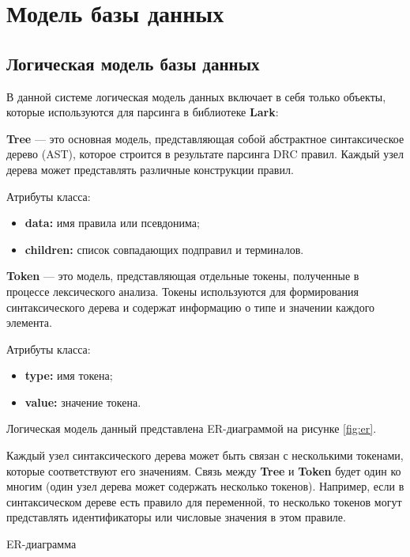 \section{Модель базы данных}

\subsection{Логическая модель базы данных}

В данной системе логическая модель данных включает в себя только объекты,
которые используются для парсинга в библиотеке \textbf{Lark}:

\textbf{Tree} --- это основная модель,
представляющая собой абстрактное синтаксическое дерево (AST),
которое строится в результате парсинга DRC правил.
Каждый узел дерева может представлять различные конструкции правил.

Атрибуты класса:

\begin{itemize}
	\item \textbf{data:} имя правила или псевдонима;
	\item \textbf{children:} список совпадающих подправил и терминалов.
\end{itemize}

\textbf{Token} --- это модель, представляющая отдельные токены,
полученные в процессе лексического анализа.
Токены используются для формирования синтаксического дерева
и содержат информацию о типе и значении каждого элемента.

Атрибуты класса:

\begin{itemize}
	\item \textbf{type:} имя токена;
	\item \textbf{value:} значение токена.
\end{itemize}

Логическая модель данный представлена ER-диаграммой на рисунке \ref{fig:er}.

Каждый узел синтаксического дерева может быть связан
с несколькими токенами, которые соответствуют его значениям.
Связь между \textbf{Tree} и \textbf{Token} будет один ко многим
(один узел дерева может содержать несколько токенов).
Например, если в синтаксическом дереве есть правило для переменной,
то несколько токенов могут представлять идентификаторы
или числовые значения в этом правиле.

\begin{image}
	\caption{ER-диаграмма}
	\label{fig:er}
\end{image}

